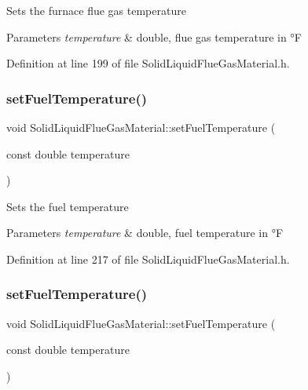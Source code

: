 Sets the furnace flue gas temperature 
\begin{DoxyParams}{Parameters}
{\em temperature} & double, flue gas temperature in °F \\
\hline
\end{DoxyParams}


Definition at line 199 of file Solid\+Liquid\+Flue\+Gas\+Material.\+h.

\mbox{\label{class_solid_liquid_flue_gas_material_a420ba1234c5f8c4b93f190b61046a589}} 
\subsubsection{\texorpdfstring{set\+Fuel\+Temperature()}{setFuelTemperature()}\hspace{0.1cm}{\footnotesize\ttfamily [1/3]}}
{\footnotesize\ttfamily void Solid\+Liquid\+Flue\+Gas\+Material\+::set\+Fuel\+Temperature (\begin{DoxyParamCaption}\item[{const double}]{temperature }\end{DoxyParamCaption})\hspace{0.3cm}{\ttfamily [inline]}}

Sets the fuel temperature 
\begin{DoxyParams}{Parameters}
{\em temperature} & double, fuel temperature in °F \\
\hline
\end{DoxyParams}


Definition at line 217 of file Solid\+Liquid\+Flue\+Gas\+Material.\+h.

\mbox{\label{class_solid_liquid_flue_gas_material_a420ba1234c5f8c4b93f190b61046a589}} 
\subsubsection{\texorpdfstring{set\+Fuel\+Temperature()}{setFuelTemperature()}\hspace{0.1cm}{\footnotesize\ttfamily [2/3]}}
{\footnotesize\ttfamily void Solid\+Liquid\+Flue\+Gas\+Material\+::set\+Fuel\+Temperature (\begin{DoxyParamCaption}\item[{const double}]{temperature }\end{DoxyParamCaption})\hspace{0.3cm}{\ttfamily [inline]}}

